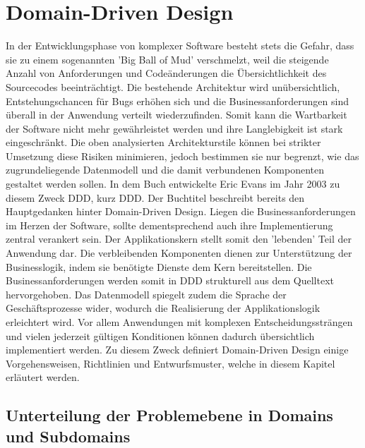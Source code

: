 \section{Domain-Driven Design}

In der Entwicklungsphase von komplexer Software besteht stets die Gefahr, dass sie zu einem sogenannten 'Big Ball of Mud' verschmelzt, weil die steigende Anzahl von Anforderungen und Codeänderungen die Übersichtlichkeit des Sourcecodes beeinträchtigt. Die bestehende Architektur wird unübersichtlich, Entstehungschancen für Bugs erhöhen sich und die Businessanforderungen sind überall in der Anwendung verteilt wiederzufinden. Somit kann die Wartbarkeit der Software nicht mehr gewährleistet werden und ihre Langlebigkeit ist stark eingeschränkt. \cite{bbom.1999} Die oben analysierten Architekturstile können bei strikter Umsetzung diese Risiken minimieren, jedoch bestimmen sie nur begrenzt, wie das zugrundeliegende Datenmodell und die damit verbundenen Komponenten gestaltet werden sollen. In dem Buch  entwickelte Eric Evans im Jahr 2003 zu diesem Zweck \acrlong{DDD}, kurz \acrshort{DDD}. Der Buchtitel beschreibt bereits den Hauptgedanken hinter Domain-Driven Design. Liegen die Businessanforderungen im Herzen der Software, sollte dementsprechend auch ihre Implementierung zentral verankert sein. Der Applikationskern stellt somit den 'lebenden' Teil der Anwendung dar. Die verbleibenden Komponenten dienen zur Unterstützung der Businesslogik, indem sie benötigte Dienste dem Kern bereitstellen. Die Businessanforderungen werden somit in DDD strukturell aus dem Quelltext hervorgehoben. Das Datenmodell spiegelt zudem die Sprache der Geschäftsprozesse wider, wodurch die Realisierung der Applikationslogik erleichtert wird. Vor allem Anwendungen mit komplexen Entscheidungssträngen und vielen jederzeit gültigen Konditionen können dadurch übersichtlich implementiert werden. Zu diesem Zweck definiert Domain-Driven Design einige Vorgehensweisen, Richtlinien und Entwurfsmuster, welche in diesem Kapitel erläutert werden. \cite{Evans.2011, Vernon.2015}

\subsection{Unterteilung der Problemebene in Domains und Subdomains}

